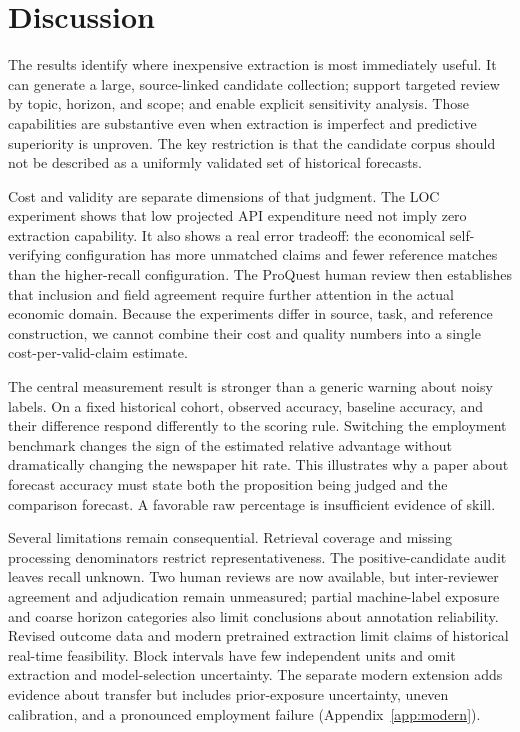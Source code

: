 \section{Discussion}
The results identify where inexpensive extraction is most immediately useful. It can generate a large, source-linked candidate collection; support targeted review by topic, horizon, and scope; and enable explicit sensitivity analysis. Those capabilities are substantive even when extraction is imperfect and predictive superiority is unproven. The key restriction is that the candidate corpus should not be described as a uniformly validated set of historical forecasts.

Cost and validity are separate dimensions of that judgment. The LOC experiment shows that low projected API expenditure need not imply zero extraction capability. It also shows a real error tradeoff: the economical self-verifying configuration has more unmatched claims and fewer reference matches than the higher-recall configuration. The ProQuest human review then establishes that inclusion and field agreement require further attention in the actual economic domain. Because the experiments differ in source, task, and reference construction, we cannot combine their cost and quality numbers into a single cost-per-valid-claim estimate.

The central measurement result is stronger than a generic warning about noisy labels. On a fixed historical cohort, observed accuracy, baseline accuracy, and their difference respond differently to the scoring rule. Switching the employment benchmark changes the sign of the estimated relative advantage without dramatically changing the newspaper hit rate. This illustrates why a paper about forecast accuracy must state both the proposition being judged and the comparison forecast. A favorable raw percentage is insufficient evidence of skill.

Several limitations remain consequential. Retrieval coverage and missing processing denominators restrict representativeness. The positive-candidate audit leaves recall unknown. Two human reviews are now available, but inter-reviewer agreement and adjudication remain unmeasured; partial machine-label exposure and coarse horizon categories also limit conclusions about annotation reliability. Revised outcome data and modern pretrained extraction limit claims of historical real-time feasibility. Block intervals have few independent units and omit extraction and model-selection uncertainty. The separate modern extension adds evidence about transfer but includes prior-exposure uncertainty, uneven calibration, and a pronounced employment failure (Appendix~\ref{app:modern}).

